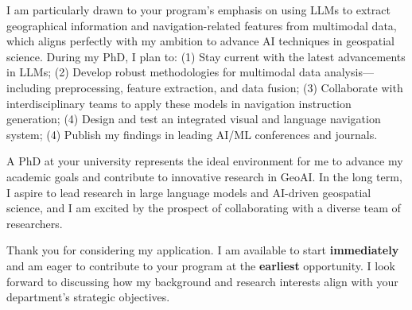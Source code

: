 \documentclass[10pt,a4paper,roman]{moderncv}
\begin{document}
I am particularly drawn to your program's emphasis on using LLMs 
to extract geographical information and navigation-related features from multimodal data, 
which aligns perfectly with my ambition to advance AI techniques in geospatial science. 
During my PhD, I plan to: 
(1) Stay current with the latest advancements in LLMs; 
(2) Develop robust methodologies for multimodal data analysis—including preprocessing, feature extraction, and data fusion; 
(3) Collaborate with interdisciplinary teams to apply these models in navigation instruction generation; 
(4) Design and test an integrated visual and language navigation system; 
(4) Publish my findings in leading AI/ML conferences and journals.

A PhD at your university represents the ideal environment for me 
to advance my academic goals and contribute to innovative research in GeoAI. 
In the long term, I aspire to lead research in large language models and AI-driven geospatial science, 
and I am excited by the prospect of collaborating with a diverse team of researchers.

Thank you for considering my application. 
I am available to start \textbf{immediately} and 
am eager to contribute to your program at the \textbf{earliest} opportunity. 
I look forward to discussing how my background and research interests align with your department's strategic objectives.


\makeletterclosing
\end{document}
